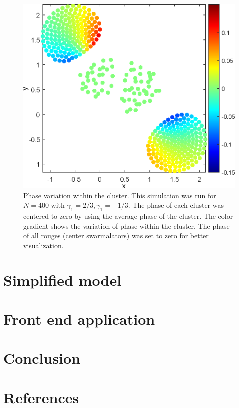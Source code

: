 \documentclass[twocolumn,10pt]{asme2ej}
\begin{document}
{    \begin{figure}[h!]
        \includegraphics[width = \linewidth]{phaseVar.eps}
        \caption{Phase variation within the cluster. This simulation was run for \(N = 400\) with \(\gamma_1 = 2/3,\gamma_1 = -1/3\). The phase of each cluster was centered to zero by using the average phase of the cluster. The color gradient shows the variation of phase within the cluster. The phase of all rouges (center swarmalators) was set to zero for better visualization. }
        \label{fig:phaseVar}
    \end{figure}
}
\noindent

\section{Simplified model}

\section{Front end application}

\section{Conclusion}


\section{References}
\end{document}
